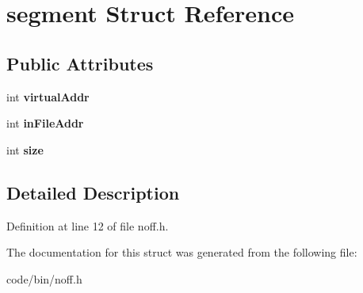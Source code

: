\section{segment Struct Reference}
\label{structsegment}
\subsection*{Public Attributes}
\begin{DoxyCompactItemize}
\item 
int {\bfseries virtual\+Addr}\label{structsegment_ae09b72dddf5782c1413ae109937bfd49}

\item 
int {\bfseries in\+File\+Addr}\label{structsegment_a52a7100e23e0cbada6befc886a4aa6ab}

\item 
int {\bfseries size}\label{structsegment_a32d32a1ee6553ade5d25c1547db5b46a}

\end{DoxyCompactItemize}


\subsection{Detailed Description}


Definition at line 12 of file noff.\+h.



The documentation for this struct was generated from the following file\+:\begin{DoxyCompactItemize}
\item 
code/bin/noff.\+h\end{DoxyCompactItemize}

